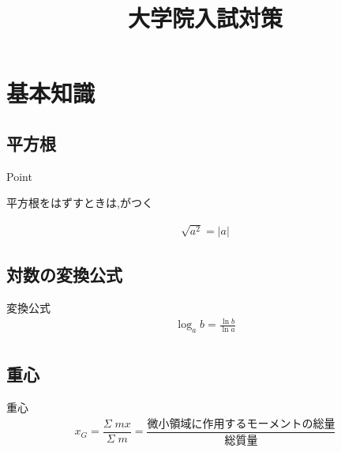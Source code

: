 \documentclass[a4paper]{jsarticle}
\author{}
\title{大学院入試対策}
\date{}
\begin{document}
\maketitle

\section{基本知識}
\subsection{平方根}
\begin{itembox}[l]{Point}
    \begin{center}
        平方根をはずすときは,がつく
    \end{center}
\end{itembox}
\begin{eqnarray*}
    \sqrt{a^2}=|a|
\end{eqnarray*}
\subsection{対数の変換公式}
\begin{itembox}[l]{変換公式}
    \begin{eqnarray*}
        \log_ab=\frac{\ln b}{\ln a}\\
    \end{eqnarray*}
\end{itembox}
\subsection{重心}
\begin{itembox}[l]{重心}
    \begin{eqnarray*}
        x_G=\dfrac{\Sigma\; mx}{\Sigma\; m}=\dfrac{微小領域に作用するモーメントの総量}{総質量}\\
    \end{eqnarray*}
\end{itembox}
\end{document}
